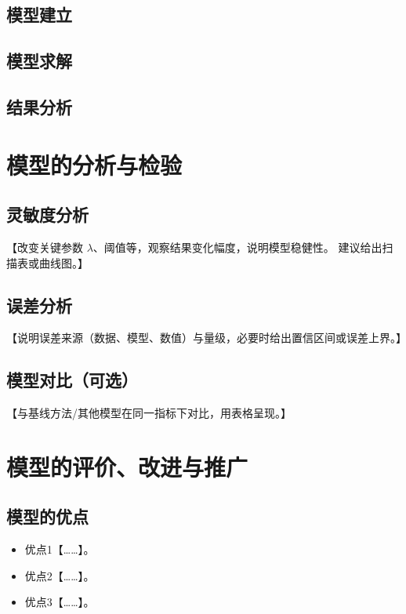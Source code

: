 \documentclass[withoutpreface,bwprint]{cumcmthesis}
\begin{document}
\subsection{模型建立}

\subsection{模型求解}

\subsection{结果分析}

\newpage
\section{模型的分析与检验}

\subsection{灵敏度分析}

【改变关键参数 $\lambda$、阈值等，观察结果变化幅度，说明模型稳健性。
建议给出扫描表或曲线图。】

\subsection{误差分析}

【说明误差来源（数据、模型、数值）与量级，必要时给出置信区间或误差上界。】

\subsection{模型对比（可选）}

【与基线方法/其他模型在同一指标下对比，用表格呈现。】

\section{模型的评价、改进与推广}

\subsection{模型的优点}
\begin{itemize}[itemindent=2em]
    \item 优点1【……】。
    \item 优点2【……】。
    \item 优点3【……】。
\end{itemize}
\end{document}
